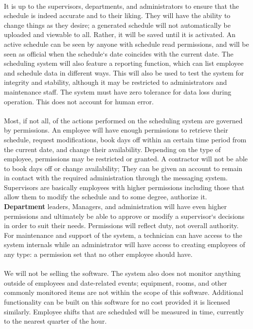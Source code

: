 \documentclass[letterpaper,12pt]{report}
\begin{document}
\paragraph*{}\hspace{0.6cm}
It is up to the supervisors, departments, and administrators to ensure that the schedule is indeed accurate and to their liking. They will have the ability to change things as they desire; a generated schedule will not automatically be uploaded and viewable to all. Rather, it will be saved until it is activated. An active schedule can be seen by anyone with schedule read permissions, and will be seen as official when the schedule`s date coincides with the current date.
The scheduling system will also feature a reporting function, which can list employee and schedule data in different ways. This will also be used to test the system for integrity and stability, although it may be restricted to administrators and maintenance staff. The system must have zero tolerance for data loss during operation. This does not account for human error.
\pagebreak
\paragraph*{}\hspace{0.6cm}
Most, if not all, of the actions performed on the scheduling system are governed by permissions. An employee will have enough permissions to retrieve their schedule, request modifications, book days off within an certain time period from the current date, and change their availability. Depending on the type of employee, permissions may be restricted or granted. A contractor will not be able to book days off or change availability; They can be given an account to remain in contact with the required administration through the messaging system. Supervisors are basically employees with higher  permissions including those that allow them to modify the schedule and to some degree, authorize it. \textbf{Department} leaders, Managers, and administration will have even higher permissions and ultimately be able to approve or modify a supervisor`s decisions in order to suit their needs. Permissions will reflect duty, not overall authority. For maintenance and support of the system, a technician can have access to the system internals while an administrator will have access to creating employees of any type: a permission set that no other employee should have.
\paragraph*{}\hspace{0.6cm}
We will not be selling the software. The system also does not monitor anything outside of employees and date-related events; equipment, rooms, and other commonly monitored items are not within the scope of this software. Additional functionality can be built on this software for no cost provided it is licensed similarly. Employee shifts that are scheduled will be measured in time, currently to the nearest quarter of the hour.
\end{document}
